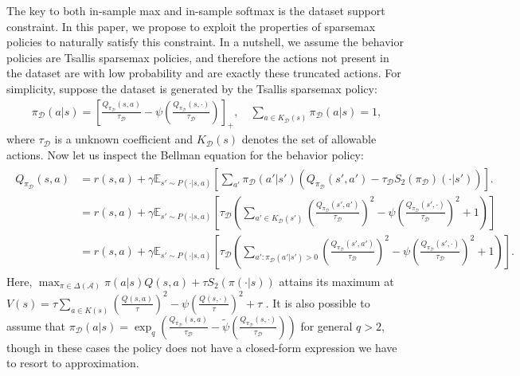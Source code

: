 \documentclass{article}
\newcommand{\AdaBracket}[1]{\left(#1\right)}
\newcommand{\AdaRectBracket}[1]{\left[#1\right]}
\newcommand{\expectation}[2]{\mathbb{E}_{#1}\AdaRectBracket{#2}}
\newcommand{\datasetPolicy}{\pi_{\mathcal{D}}}
\begin{document}
The key to both in-sample max \cite{Fujimoto2019-InSampleMax} and in-sample softmax \cite{Xiao2023-InSampleSoftmax} is the dataset support constraint.
In this paper, we propose to exploit the properties of sparsemax policies to naturally satisfy this constraint.
In a nutshell, we assume the behavior policies are Tsallis sparsemax policies, and therefore the actions not present in the dataset are with low probability and are exactly these truncated actions.
For simplicity, suppose the dataset is generated by the Tsallis sparsemax policy:
\begin{align}
    \datasetPolicy(a|s) = \AdaRectBracket{\frac{Q_{\datasetPolicy}(s,a)}{\tau_\mathcal{D}} - \psi\AdaBracket{\frac{Q_{\datasetPolicy}(s, \cdot)}{\tau_\mathcal{D}}}}_{+},  \quad \sum_{a\in K_\mathcal{D}(s)} \pi_\mathcal{D}(a|s)= 1,
\end{align}
where $\tau_\mathcal{D}$ is a unknown coefficient and $K_\mathcal{D}(s)$ denotes the set of allowable actions.
Now let us inspect the Bellman equation for the behavior policy:
\begin{align}
    \begin{split}
    Q_{\datasetPolicy}(s,a) &= r(s,a) +  \gamma \expectation{s'\sim P(\cdot | s,a)}{ \sum_{a'} \datasetPolicy(a'|s') \AdaBracket{Q_{\datasetPolicy}(s',a') - \tau_{\mathcal{D}} S_2(\datasetPolicy)(\cdot|s')}}. \\ 
    &= r(s,a) +  \gamma \expectation{s'\sim P(\cdot | s,a)}{ \tau_{\mathcal{D}} \AdaBracket{ \sum_{a' \in K_{\mathcal{D}}(s')} \AdaBracket{\frac{Q_{\datasetPolicy}(s',a')}{\tau_{\mathcal{D}}}}^2 - \psi \AdaBracket{\frac{Q_{\datasetPolicy}(s', \cdot)}{\tau_{\mathcal{D}}}}^2 + 1 }}\\
    &= r(s,a) +  \gamma \expectation{s'\sim P(\cdot | s,a)}{ \tau_{\mathcal{D}} \AdaBracket{ \sum_{a': \datasetPolicy(a'|s') > 0} \AdaBracket{\frac{Q_{\datasetPolicy}(s',a')}{\tau_{\mathcal{D}}}}^2 - \psi \AdaBracket{\frac{Q_{\datasetPolicy}(s', \cdot)}{\tau_{\mathcal{D}}}}^2 + 1 }}.
    \label{eq:insample_sparsemax}
    \end{split}
\end{align}
Here, $\max_{\pi \in \Delta(\mathcal{A})}\pi(a|s)Q(s,a) + \tau S_2(\pi(\cdot|s)) $ attains its maximum at $V(s) = \tau \sum_{a \in K(s)}\AdaBracket{ \frac{Q(s,a)}{\tau} }^2 - \psi\AdaBracket{\frac{Q(s, \cdot)}{\tau}}^2 + \tau$ \cite{Lee2018-TsallisRAL,Martins16-sparsemax}.
It is also possible to assume that $\datasetPolicy(a|s) = \exp_q\AdaBracket{\frac{Q_{\datasetPolicy}(s,a)}{\tau_\mathcal{D}} - \tilde{\psi}\AdaBracket{\frac{Q_{\datasetPolicy}(s, \cdot)}{\tau_\mathcal{D}}}}$ for general $q>2$, though in these cases the policy does not have a closed-form expression we have to resort to approximation.
\end{document}
